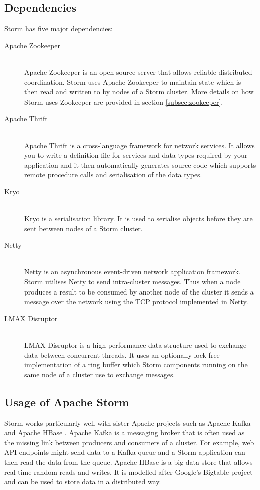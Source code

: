 \documentclass[bsc,deptreport,twoside,singlespacing,normalheadings,parskip]{infthesis}\usepackage[]{graphicx}\usepackage[]{color}
\begin{document}
\subsection{Dependencies}

Storm has five major dependencies:

\begin{description}
	\item[Apache Zookeeper] \hfill \\
	Apache Zookeeper \citep{ApacheZookeeper} is an open source server that allows reliable distributed coordination. Storm uses Apache Zookeeper to maintain state which is then read and written to by nodes of a Storm cluster. More details on how Storm uses Zookeeper are provided in section \ref{subsec:zookeeper}.
	\item[Apache Thrift] \hfill \\
	Apache Thrift \citep{ApacheThrift} is a cross-language framework for network services. It allows you to write a definition file for services and data types required by your application and it then automatically generates source code which supports remote procedure calls and serialisation of the data types.
	\item[Kryo] \hfill \\
	Kryo \citep{EsotericKryo} is a serialisation library. It is used to serialise objects before they are sent between nodes of a Storm cluster.
	\item[Netty] \hfill \\
	Netty \citep{Netty} is an asynchronous event-driven network application framework. Storm utilises Netty to send intra-cluster messages. Thus when a node produces a result to be consumed by another node of the cluster it sends a message over the network using the TCP protocol implemented in Netty.
	\item[LMAX Disruptor] \hfill \\
	LMAX Disruptor \cite{LMAXDisruptor} is a high-performance data structure used to exchange data between concurrent threads. It uses an optionally lock-free implementation of a ring buffer which Storm components running on the same node of a cluster use to exchange messages.
\end{description}

\subsection{Usage of Apache Storm}

Storm works particularly well with sister Apache projects such as Apache Kafka \cite{ApacheKafka} and Apache HBase \cite{ApacheHBase}. Apache Kafka is a messaging broker that is often used as the missing link between producers and consumers of a cluster. For example, web API endpoints might send data to a Kafka queue and a Storm application can then read the data from the queue. Apache HBase is a big data-store that allows real-time random reads and writes. It is modelled after Google's Bigtable project \cite{Chang:2008:BDS:1365815.1365816} and can be used to store data in a distributed way.
\end{document}
